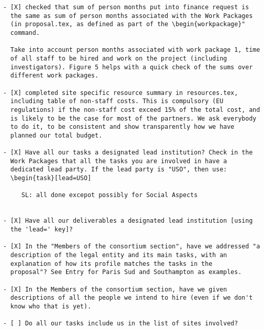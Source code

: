 \begin{draft}
  \vspace{1cm}

\begin{verbatim}
- [X] checked that sum of person months put into finance request is
  the same as sum of person months associated with the Work Packages
  (in proposal.tex, as defined as part of the \begin{workpackage}"
  command.
  
  Take into account person months associated with work package 1, time
  of all staff to be hired and work on the project (including
  investigators). Figure 5 helps with a quick check of the sums over
  different work packages.

- [X] completed site specific resource summary in resources.tex,
  including table of non-staff costs. This is compulsory (EU
  regulations) if the non-staff cost exceed 15% of the total cost, and
  is likely to be the case for most of the partners. We ask everybody
  to do it, to be consistent and show transparently how we have
  planned our total budget.

- [X] Have all our tasks a designated lead institution? Check in the
  Work Packages that all the tasks you are involved in have a
  dedicated lead party. If the lead party is "USO", then use:
  \begin{task}[lead=USO]

     SL: all done excepot possibly for Social Aspects


- [X] Have all our deliverables a designated lead institution [using
  the 'lead=' key]?

- [X] In the "Members of the consortium section", have we addressed "a
  description of the legal entity and its main tasks, with an
  explanation of how its profile matches the tasks in the
  proposal"? See Entry for Paris Sud and Southampton as examples.
  
- [X] In the Members of the consortium section, have we given
  descriptions of all the people we intend to hire (even if we don't
  know who that is yet). 
  
- [ ] Do all our tasks include us in the list of sites involved?
\end{verbatim}
\end{draft}





